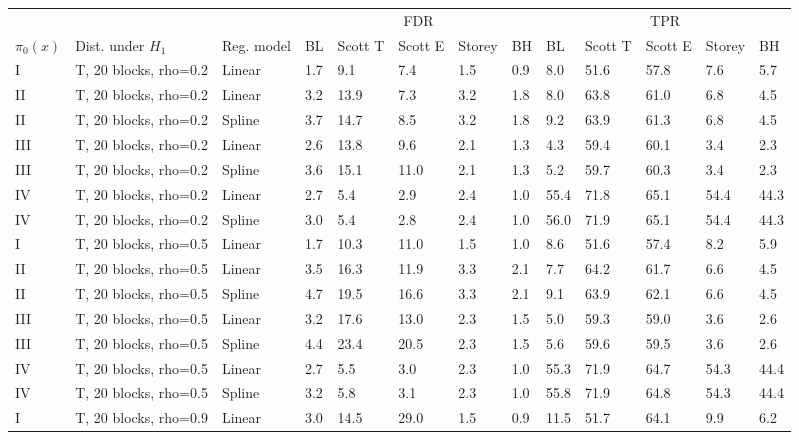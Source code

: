 \documentclass{article}\usepackage[]{graphicx}\usepackage[]{color}
\begin{document}
\begin{table}[ht]
\centering
\begin{tabular}{lll|lllll|lllll}
  \hline
  &&& \multicolumn{5}{c}{FDR} & \multicolumn{5}{c}{TPR}\\
 $\pi_0(x)$ &  Dist. under $H_1$ & Reg. model & BL & Scott T & Scott E & Storey & BH & BL & Scott T & Scott E & Storey & BH    \\
 \hline
I & T, 20 blocks, rho=0.2 & Linear & 1.7 & 9.1 & 7.4 & 1.5 & 0.9 & 8.0 & 51.6 & 57.8 & 7.6 & 5.7 \\ 
  II & T, 20 blocks, rho=0.2 & Linear & 3.2 & 13.9 & 7.3 & 3.2 & 1.8 & 8.0 & 63.8 & 61.0 & 6.8 & 4.5 \\ 
  II & T, 20 blocks, rho=0.2 & Spline & 3.7 & 14.7 & 8.5 & 3.2 & 1.8 & 9.2 & 63.9 & 61.3 & 6.8 & 4.5 \\ 
  III & T, 20 blocks, rho=0.2 & Linear & 2.6 & 13.8 & 9.6 & 2.1 & 1.3 & 4.3 & 59.4 & 60.1 & 3.4 & 2.3 \\ 
  III & T, 20 blocks, rho=0.2 & Spline & 3.6 & 15.1 & 11.0 & 2.1 & 1.3 & 5.2 & 59.7 & 60.3 & 3.4 & 2.3 \\ 
  IV & T, 20 blocks, rho=0.2 & Linear & 2.7 & 5.4 & 2.9 & 2.4 & 1.0 & 55.4 & 71.8 & 65.1 & 54.4 & 44.3 \\ 
  IV & T, 20 blocks, rho=0.2 & Spline & 3.0 & 5.4 & 2.8 & 2.4 & 1.0 & 56.0 & 71.9 & 65.1 & 54.4 & 44.3 \\ 
   \hline
I & T, 20 blocks, rho=0.5 & Linear & 1.7 & 10.3 & 11.0 & 1.5 & 1.0 & 8.6 & 51.6 & 57.4 & 8.2 & 5.9 \\ 
  II & T, 20 blocks, rho=0.5 & Linear & 3.5 & 16.3 & 11.9 & 3.3 & 2.1 & 7.7 & 64.2 & 61.7 & 6.6 & 4.5 \\ 
  II & T, 20 blocks, rho=0.5 & Spline & 4.7 & 19.5 & 16.6 & 3.3 & 2.1 & 9.1 & 63.9 & 62.1 & 6.6 & 4.5 \\ 
  III & T, 20 blocks, rho=0.5 & Linear & 3.2 & 17.6 & 13.0 & 2.3 & 1.5 & 5.0 & 59.3 & 59.0 & 3.6 & 2.6 \\ 
  III & T, 20 blocks, rho=0.5 & Spline & 4.4 & 23.4 & 20.5 & 2.3 & 1.5 & 5.6 & 59.6 & 59.5 & 3.6 & 2.6 \\ 
  IV & T, 20 blocks, rho=0.5 & Linear & 2.7 & 5.5 & 3.0 & 2.3 & 1.0 & 55.3 & 71.9 & 64.7 & 54.3 & 44.4 \\ 
  IV & T, 20 blocks, rho=0.5 & Spline & 3.2 & 5.8 & 3.1 & 2.3 & 1.0 & 55.8 & 71.9 & 64.8 & 54.3 & 44.4 \\ 
   \hline
I & T, 20 blocks, rho=0.9 & Linear & 3.0 & 14.5 & 29.0 & 1.5 & 0.9 & 11.5 & 51.7 & 64.1 & 9.9 & 6.2 \\ 

\end{tabular}
\end{table}
\end{document}
